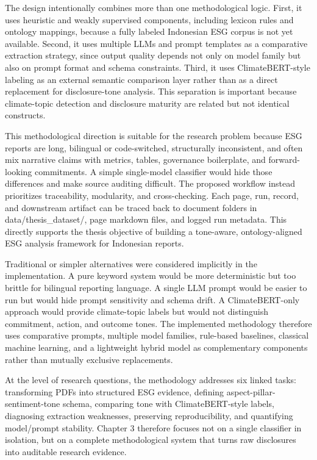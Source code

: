 The design intentionally combines more than one methodological logic. First, it uses heuristic and weakly supervised components, including lexicon rules and ontology mappings, because a fully labeled Indonesian ESG corpus is not yet available. Second, it uses multiple LLMs and prompt templates as a comparative extraction strategy, since output quality depends not only on model family but also on prompt format and schema constraints. Third, it uses ClimateBERT-style labeling as an external semantic comparison layer rather than as a direct replacement for disclosure-tone analysis. This separation is important because climate-topic detection and disclosure maturity are related but not identical constructs.

This methodological direction is suitable for the research problem because ESG reports are long, bilingual or code-switched, structurally inconsistent, and often mix narrative claims with metrics, tables, governance boilerplate, and forward-looking commitments. A simple single-model classifier would hide those differences and make source auditing difficult. The proposed workflow instead prioritizes traceability, modularity, and cross-checking. Each page, run, record, and downstream artifact can be traced back to document folders in data/thesis\_dataset/, page markdown files, and logged run metadata. This directly supports the thesis objective of building a tone-aware, ontology-aligned ESG analysis framework for Indonesian reports.

Traditional or simpler alternatives were considered implicitly in the implementation. A pure keyword system would be more deterministic but too brittle for bilingual reporting language. A single LLM prompt would be easier to run but would hide prompt sensitivity and schema drift. A ClimateBERT-only approach would provide climate-topic labels but would not distinguish commitment, action, and outcome tones. The implemented methodology therefore uses comparative prompts, multiple model families, rule-based baselines, classical machine learning, and a lightweight hybrid model as complementary components rather than mutually exclusive replacements.

At the level of research questions, the methodology addresses six linked tasks: transforming PDFs into structured ESG evidence, defining aspect-pillar-sentiment-tone schema, comparing tone with ClimateBERT-style labels, diagnosing extraction weaknesses, preserving reproducibility, and quantifying model/prompt stability. Chapter 3 therefore focuses not on a single classifier in isolation, but on a complete methodological system that turns raw disclosures into auditable research evidence.

